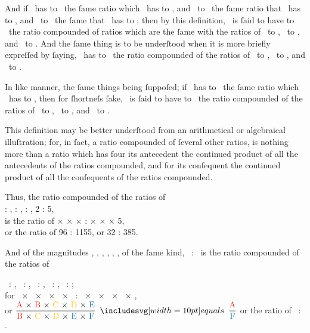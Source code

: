 \documentclass[11pt,preview]{standalone}
\begin{document}
And if \redA\ has to \redB\ the ſame ratio which \blueE\ has to \blueF, and \redB\ to \redC\ the ſame ratio that \blueG\ has to \blueH, and \redC\ to \redD\ the ſame that \blueK\ has to \blueL; then by this definition, \redA\ is ſaid to have to \redD\ the ratio compounded of ratios which are the ſame with the ratios of \blueE\ to \blueF, \blueG\ to \blueH, and \blueK\ to \blueL. And the ſame thing is to be underſtood when it is more briefly expreſſed by ſaying, \redA\ has to \redD\ the ratio compounded of the ratios of \blueE\ to \blueF, \blueG\ to \blueH, and \blueK\ to \blueL.

In like manner, the ſame things being ſuppoſed; if \yellowM\ has to \yellowN\ the ſame ratio which \redA\ has to \redD, then for ſhortneſs ſake, \yellowM\ is ſaid to have to \yellowN\ the ratio compounded of the ratios of \blueE\ to \blueF, \blueG\ to \blueH, and \blueK\ to \blueL.

This definition may be better underſtood from an arithmetical or algebraical illuſtration; for, in fact, a ratio compounded of ſeveral other ratios, is nothing more than a ratio which has four its antecedent the continued product of all the antecedents of the ratios compounded, and for its conſequent the continued product of all the conſequents of the ratios compounded.

\hfill

\begin{center}
    Thus, the ratio compounded of the ratios of\\
    {\color{cred}{2}} : {\color{cred}{3}}, {\color{cyellow}{4}} : {\color{cyellow}{7}}, {\color{cblue}{6}} : {\color{cblue}{11}}, 2 : 5,\\
    is the ratio of {\color{cred}{2}} × {\color{cyellow}{4}} × {\color{cblue}{6}} × {\color{cred}{2}} : {\color{cred}{3}} × {\color{cyellow}{7}} × {\color{cblue}{11}} × 5,\\
    or the ratio of 96 : 1155, or 32 : 385.
\end{center}

And of the magnitudes \redA, \redB, \yellowC, \yellowD, \blueE, \blueF, of the ſame kind, \redA\ : \blueF\ is the ratio compounded of the ratios of

\begin{center}
    \redA\ : \redB, \redB\ : \yellowC, \yellowC\ : \yellowD, \yellowD\ : \blueE, \blueE\ : \blueF;\\
    for \redA\ × \redB\ × \yellowC\ × \yellowD\ × \blueE\ : \redB\ × \yellowC\ × \yellowD\ × \blueE\ × \blueF,\\
    or $\dfrac{\text{\redA\ × \redB\ × \yellowC\ × \yellowD\ × \blueE}}{\text{\redB\ × \yellowC\ × \yellowD\ × \blueE\ × \blueF}} \bequals \dfrac{\text{\redA}}{\text{\blueF}}$ or the ratio of \redA\ : \blueF.
\end{center}
\end{document}
